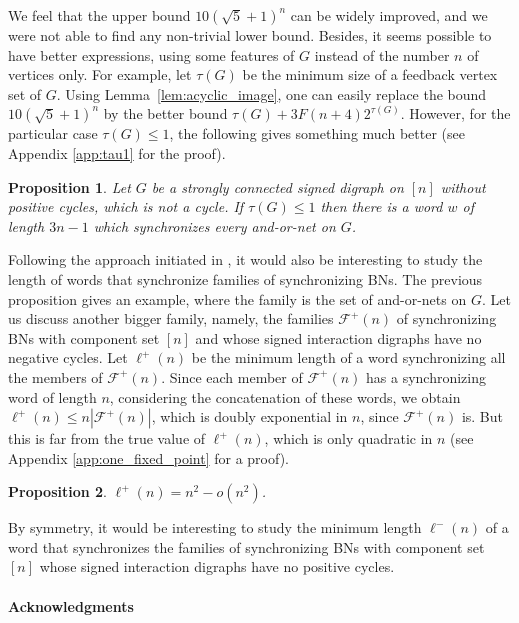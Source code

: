 \documentclass[11pt,letter]{article}
\newtheorem{proposition}{Proposition}
\begin{document}
\medskip
We feel that the upper bound $10(\sqrt{5}+1)^n$ can be widely improved, and we were not able to find any non-trivial lower bound. Besides, it seems possible to have better expressions, using some features of $G$ instead of the number $n$ of vertices only. For example, let $\tau(G)$ be the minimum size of a feedback vertex set of $G$. Using Lemma~\ref{lem:acyclic_image}, one can easily replace the bound $10(\sqrt{5}+1)^n$ by the better bound $\tau(G)+3F(n+4)2^{\tau(G)}$. However, for the particular case $\tau(G)\leq 1$, the following gives something much better (see Appendix \ref{app:tau1} for the proof). 

\begin{proposition}\label{pro:tau1}
Let $G$ be a strongly connected signed digraph on $[n]$ without positive cycles, which is not a cycle. If $\tau(G)\leq 1$ then there is a word $w$ of length $3n-1$ which synchronizes every and-or-net on $G$.
\end{proposition}

Following the approach initiated in \cite{AGRS20}, it would also be interesting to study the length of words that synchronize families of synchronizing BNs. The previous proposition gives an example, where the family is the set of and-or-nets on $G$. Let us discuss another bigger family, namely, the families $\mathcal{F}^+(n)$ of synchronizing BNs with component set $[n]$ and whose signed interaction digraphs have no negative cycles. Let $\ell^+(n)$ be the minimum length of a word synchronizing all the members of $\mathcal{F}^+(n)$. Since each member of $\mathcal{F}^+(n)$ has a synchronizing word of length $n$, considering the concatenation of these words, we obtain $\ell^+(n)\leq n|\mathcal{F}^+(n)|$, which is doubly exponential in $n$, since $\mathcal{F}^+(n)$ is. But this is far from the true value of $\ell^+(n)$, which is only quadratic in $n$ (see Appendix \ref{app:one_fixed_point} for a proof). 

\begin{proposition}\label{pro:l+}
$\ell^+(n)=n^2-o(n^2)$. 
\end{proposition}

By symmetry, it would be interesting to study the minimum length $\ell^-(n)$ of a word that synchronizes the families of synchronizing BNs with component set $[n]$ whose signed interaction digraphs have no positive cycles. 

\paragraph{Acknowledgments}
\end{document}
